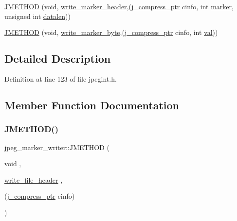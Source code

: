\begin{DoxyCompactItemize}
\mbox{\hyperlink{structjpeg__marker__writer_a9719adf2a97800fee631854f46222889}{J\+M\+E\+T\+H\+OD}} (void, \mbox{\hyperlink{jcmarker_8c_a8c03fbb86d90f4dddf41d4d7002ec881}{write\+\_\+marker\+\_\+header}},(\mbox{\hyperlink{jpeglib_8h_add2a072c54e3a51550f4975f7ddb91e7}{j\+\_\+compress\+\_\+ptr}} cinfo, int \mbox{\hyperlink{jpeglib_8h_a55fc502015142062735ebfd18c825354}{marker}}, unsigned int \mbox{\hyperlink{jpeglib_8h_a37893c863bbe3ef78feca71570de3017}{datalen}}))
\item 
\mbox{\hyperlink{structjpeg__marker__writer_a193395c80dab66a95681aff53cd5c468}{J\+M\+E\+T\+H\+OD}} (void, \mbox{\hyperlink{jcmarker_8c_a6cbd2d536978f7c91a0ff7f2580e1a52}{write\+\_\+marker\+\_\+byte}},(\mbox{\hyperlink{jpeglib_8h_add2a072c54e3a51550f4975f7ddb91e7}{j\+\_\+compress\+\_\+ptr}} cinfo, int \mbox{\hyperlink{jpeglib_8h_aa0ccb5ee6d882ee3605ff47745c6467b}{val}}))
\end{DoxyCompactItemize}


\subsection{Detailed Description}


Definition at line 123 of file jpegint.\+h.



\subsection{Member Function Documentation}
\mbox{\label{structjpeg__marker__writer_ac5570409054c19f502583dff69fb8fab}} 
\subsubsection{\texorpdfstring{JMETHOD()}{JMETHOD()}\hspace{0.1cm}{\footnotesize\ttfamily [1/7]}}
{\footnotesize\ttfamily jpeg\+\_\+marker\+\_\+writer\+::\+J\+M\+E\+T\+H\+OD (\begin{DoxyParamCaption}\item[{void}]{,  }\item[{\mbox{\hyperlink{jcmarker_8c_a0a1af4c95150b6cc958ce4a04580800d}{write\+\_\+file\+\_\+header}}}]{,  }\item[{(\mbox{\hyperlink{jpeglib_8h_add2a072c54e3a51550f4975f7ddb91e7}{j\+\_\+compress\+\_\+ptr}} cinfo)}]{ }\end{DoxyParamCaption})}

